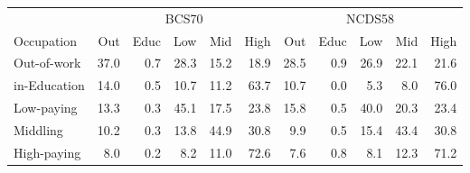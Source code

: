 
\begin{tabular}{lrrrrrrrrrr}
\toprule
\multicolumn{1}{c}{} & \multicolumn{5}{c}{BCS70} & \multicolumn{5}{c}{NCDS58} \\
\cmidrule(l{3pt}r{3pt}){2-6} \cmidrule(l{3pt}r{3pt}){7-11}
Occupation & Out & Educ & Low & Mid & High & Out & Educ & Low & Mid & High\\
\midrule
Out-of-work & 37.0 & 0.7 & 28.3 & 15.2 & 18.9 & 28.5 & 0.9 & 26.9 & 22.1 & 21.6\\
in-Education & 14.0 & 0.5 & 10.7 & 11.2 & 63.7 & 10.7 & 0.0 & 5.3 & 8.0 & 76.0\\
Low-paying & 13.3 & 0.3 & 45.1 & 17.5 & 23.8 & 15.8 & 0.5 & 40.0 & 20.3 & 23.4\\
Middling & 10.2 & 0.3 & 13.8 & 44.9 & 30.8 & 9.9 & 0.5 & 15.4 & 43.4 & 30.8\\
High-paying & 8.0 & 0.2 & 8.2 & 11.0 & 72.6 & 7.6 & 0.8 & 8.1 & 12.3 & 71.2\\
\bottomrule
\end{tabular}
